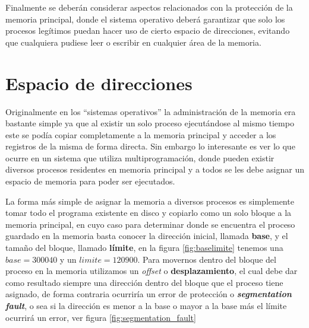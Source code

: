 Finalmente se deberán considerar aspectos relacionados con la protección de la
memoria principal, donde el sistema operativo deberá garantizar que solo los
procesos legítimos puedan hacer uso de cierto espacio de direcciones, evitando
que cualquiera pudiese leer o escribir en cualquier área de la memoria.

\section{Espacio de direcciones}
Originalmente en los ``sistemas operativos'' la administración de la memoria era
bastante simple ya que al existir un solo proceso ejecutándose al mismo tiempo
este se podía copiar completamente a la memoria principal y acceder a los
registros de la misma de forma directa. Sin embargo lo interesante es ver lo que
ocurre en un sistema que utiliza multiprogramación, donde pueden existir
diversos procesos residentes en memoria principal y a todos se les debe asignar
un espacio de memoria para poder ser ejecutados.

La forma más simple de asignar la memoria a diversos procesos es simplemente
tomar todo el programa existente en disco y copiarlo como un solo bloque a la
memoria principal, en cuyo caso para determinar donde se encuentra el proceso
guardado en la memoria basta conocer la dirección inicial, llamada
\textbf{base}, y el tamaño del bloque, llamado \textbf{límite}, en la figura
\ref{fig:baselimite} tenemos una $base=300040$ y un $limite=120900$. Para
movernos dentro del bloque del proceso en la memoria utilizamos un
\textit{offset} o \textbf{desplazamiento}, el cual debe dar como resultado
siempre una dirección dentro del bloque que el proceso tiene asignado, de forma
contraria ocurriría un error de protección o \textit{\textbf{segmentation
fault}}, o sea si la dirección es menor a la base o mayor a la base más el
límite ocurrirá un error, ver figura \ref{fig:segmentation_fault}

